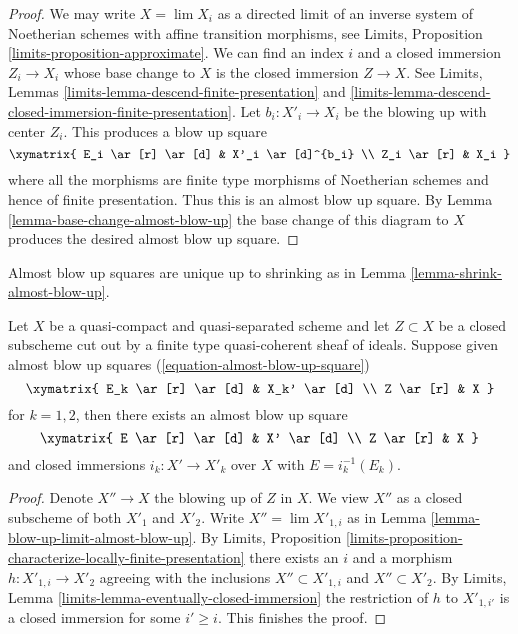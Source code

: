 \begin{proof}
We may write $X = \lim X_i$ as a directed limit of an inverse system
of Noetherian schemes with affine transition morphisms, see
Limits, Proposition \ref{limits-proposition-approximate}.
We can find an index $i$ and a closed immersion $Z_i \to X_i$
whose base change to $X$ is the closed immersion $Z \to X$.
See Limits, Lemmas \ref{limits-lemma-descend-finite-presentation} and
\ref{limits-lemma-descend-closed-immersion-finite-presentation}.
Let $b_i : X'_i \to X_i$ be the blowing up with center $Z_i$.
This produces a blow up square
$$
\xymatrix{
E_i \ar[r] \ar[d] & X'_i \ar[d]^{b_i} \\
Z_i \ar[r] & X_i
}
$$
where all the morphisms are finite type morphisms of Noetherian schemes
and hence of finite presentation. Thus this is an almost blow up square.
By Lemma \ref{lemma-base-change-almost-blow-up}
the base change of this diagram to $X$ produces the desired
almost blow up square.
\end{proof}

\noindent
Almost blow up squares are unique up to shrinking as in
Lemma \ref{lemma-shrink-almost-blow-up}.

\begin{lemma}
\label{lemma-almost-blow-up-unique}
Let $X$ be a quasi-compact and quasi-separated scheme and let $Z \subset X$
be a closed subscheme cut out by a finite type quasi-coherent sheaf of ideals.
Suppose given almost blow up squares (\ref{equation-almost-blow-up-square})
$$
\xymatrix{
E_k \ar[r] \ar[d] & X_k' \ar[d] \\
Z \ar[r] & X
}
$$
for $k = 1, 2$, then there exists an almost blow up square
$$
\xymatrix{
E \ar[r] \ar[d] & X' \ar[d] \\
Z \ar[r] & X
}
$$
and closed immersions $i_k : X' \to X'_k$ over $X$
with $E = i_k^{-1}(E_k)$.
\end{lemma}

\begin{proof}
Denote $X'' \to X$ the blowing up of $Z$ in $X$.
We view $X''$ as a closed subscheme of both $X'_1$ and $X'_2$.
Write $X'' = \lim X'_{1, i}$ as in
Lemma \ref{lemma-blow-up-limit-almost-blow-up}.
By Limits, Proposition
\ref{limits-proposition-characterize-locally-finite-presentation}
there exists an $i$ and a morphism $h : X'_{1, i} \to X'_2$ agreeing
with the inclusions $X'' \subset X'_{1, i}$ and $X'' \subset X'_2$.
By Limits, Lemma \ref{limits-lemma-eventually-closed-immersion}
the restriction of $h$ to $X'_{1, i'}$ is a closed immersion
for some $i' \geq i$. This finishes the proof.
\end{proof}

